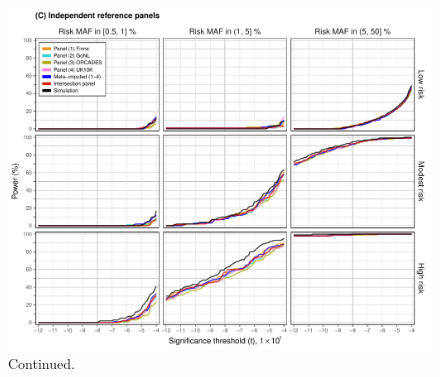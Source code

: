 \begin{figure}[tb]
\ContinuedFloat
\includegraphics[width=\textwidth]{./img/ch2/association_power_C}
\caption[]{Continued.}
\label{fig:gwas_power_C}
\end{figure}
